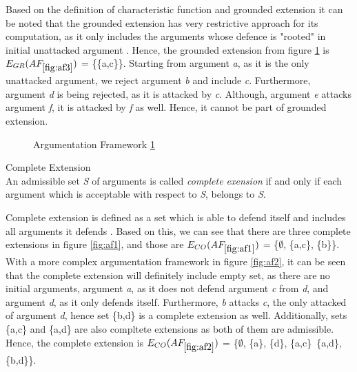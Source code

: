 Based on the definition of characteristic function and grounded extension it can be noted that the grounded extension has very restrictive approach for its computation, as it only includes the arguments whose defence is "rooted" in initial unattacked argument \citep{baroni2009semantics}. Hence, the grounded extension from figure \ref{fig:af3} is \textit{$E_{GR}(AF_{\ref{fig:af3}})$} = \{\{a,c\}\}. Starting from argument \textit{a}, as it is the only unattacked argument, we reject argument \textit{b} and include \textit{c}. Furthermore, argument \textit{d} is being rejected, as it is attacked by \textit{c}. Although, argument \textit{e} attacks argument \textit{f}, it is attacked by \textit{f} as well. Hence, it cannot be part of grounded extension.

\begin{figure}[h]
\centering
{}
\caption{Argumentation Framework \ref{fig:af3}}
\label{fig:af3}
\end{figure}

\begin{definition}{Complete Extension}
\label{def:completeExtension}\\
An admissible set \textit{S} of arguments is called \textit{complete exension} if and only if each argument which is acceptable with respect to \textit{S}, belongs to \textit{S}.
\end{definition}

Complete extension is defined as a set which is able to defend itself and includes all arguments it defends \citep{baroni2009semantics}. Based on this, we can see that there are three complete extensions in figure \ref{fig:af1}, and those are \textit{$E_{CO}(AF_{\ref{fig:af1}})$} = \{$\emptyset$, \{a,c\}, \{b\}\}. With a more complex argumentation framework in figure \ref{fig:af2}, it can be seen that the complete extension will definitely include empty set, as there are no initial arguments, argument \textit{a}, as it does not defend argument \textit{c} from \textit{d}, and argument \textit{d}, as it only defends itself. Furthermore, \textit{b} attacks \textit{c}, the only attacked of argument \textit{d}, hence set \{b,d\} is a complete extension as well. Additionally, sets \{a,c\} and \{a,d\} are also compltete extensions as both of them are admissible. Hence, the complete extension is \textit{$E_{CO}(AF_{\ref{fig:af2}})$} = \{$\emptyset$, \{a\}, \{d\}, \{a,c\}\, \{a,d\}, \{b,d\}\}.

